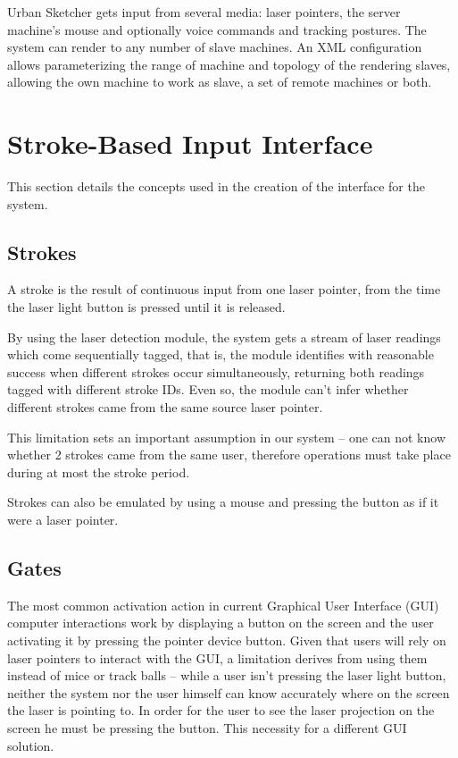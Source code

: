 Urban Sketcher gets input from several media:
laser pointers, the server machine's mouse and optionally voice commands and tracking postures.
The system can render to any number of slave machines.
An XML configuration allows parameterizing the range of machine and topology of the rendering slaves,
allowing the own machine to work as slave, a set of remote machines or both.


\section{Stroke-Based Input Interface}

This section details the concepts used in the creation of the interface for the system.

\subsection{Strokes}

A stroke is the result of continuous input from one laser pointer, from the time the laser
light button is pressed until it is released. 

By using the laser detection module, the system gets a stream of laser readings which
come sequentially tagged, that is, the module identifies with reasonable success when different strokes
occur simultaneously, returning both readings tagged with different stroke IDs.
Even so, the module can't infer whether different strokes came from the same source laser pointer.

This limitation sets an important assumption in our system -- one can not know whether 2 strokes came
from the same user, therefore operations must take place during at most the stroke period.

Strokes can also be emulated by using a mouse and pressing
the button as if it were a laser pointer.




\subsection{Gates}

The most common activation action in current Graphical User Interface (GUI) computer interactions work
by displaying a button on the screen and the user activating it by pressing the pointer device button.
Given that users will rely on laser pointers to interact with the GUI, a limitation derives from
using them instead of mice or track balls -- while a user isn't pressing the laser light button,
neither the system nor the user himself can know accurately where on the screen the laser is pointing to.
In order for the user to see the laser projection on the screen he must be pressing the button.
This necessity  for a different GUI solution.

